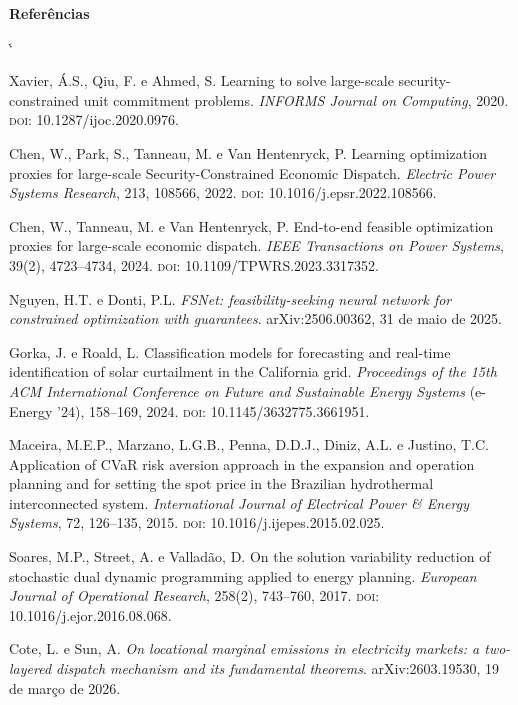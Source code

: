 \documentclass[10pt,a4paper,oneside]{book}
\makeatletter
\renewenvironment{thebibliography}[1]
  {\list{\@biblabel{\@arabic\c@enumiv}}%
     {\settowidth\labelwidth{\@biblabel{#1}}%
      \leftmargin\labelwidth \advance\leftmargin\labelsep
      \usecounter{enumiv}\let\p@enumiv\@empty
      \renewcommand\theenumiv{\@arabic\c@enumiv}}%
   \sloppy\clubpenalty4000 \@clubpenalty\clubpenalty
   \widowpenalty4000 \sfcode`\.\@m}
  {\endlist}
\makeatother
\begin{document}
\clearpage
{\sffamily\bfseries\large Referências\par}
\vspace{0.3em}
{\sffamily\fontsize{7.4}{9.4}\selectfont\color{tinta2}
\begin{thebibliography}{99}
\setlength{\itemsep}{0.2em}

 Xavier, Á.S., Qiu, F. e Ahmed, S. Learning to solve
  large-scale security-constrained unit commitment problems. \emph{INFORMS
  Journal on Computing}, 2020. \textsc{doi}: 10.1287/ijoc.2020.0976.

 Chen, W., Park, S., Tanneau, M. e Van Hentenryck, P.
  Learning optimization proxies for large-scale Security-Constrained Economic
  Dispatch. \emph{Electric Power Systems Research}, 213, 108566, 2022.
  \textsc{doi}: 10.1016/j.epsr.2022.108566.

 Chen, W., Tanneau, M. e Van Hentenryck, P. End-to-end
  feasible optimization proxies for large-scale economic dispatch. \emph{IEEE
  Transactions on Power Systems}, 39(2), 4723--4734, 2024. \textsc{doi}:
  10.1109/TPWRS.2023.3317352.

 Nguyen, H.T. e Donti, P.L. \emph{FSNet: feasibility-seeking
  neural network for constrained optimization with guarantees}.
  arXiv:2506.00362, 31 de maio de 2025.

 Gorka, J. e Roald, L. Classification models for forecasting
  and real-time identification of solar curtailment in the California grid.
  \emph{Proceedings of the 15th ACM International Conference on Future and
  Sustainable Energy Systems} (e-Energy '24), 158--169, 2024. \textsc{doi}:
  10.1145/3632775.3661951.

 Maceira, M.E.P., Marzano, L.G.B., Penna, D.D.J., Diniz,
  A.L. e Justino, T.C. Application of CVaR risk aversion approach in the
  expansion and operation planning and for setting the spot price in the
  Brazilian hydrothermal interconnected system. \emph{International Journal of
  Electrical Power \& Energy Systems}, 72, 126--135, 2015. \textsc{doi}:
  10.1016/j.ijepes.2015.02.025.

 Soares, M.P., Street, A. e Valladão, D. On the solution
  variability reduction of stochastic dual dynamic programming applied to
  energy planning. \emph{European Journal of Operational Research}, 258(2),
  743--760, 2017. \textsc{doi}: 10.1016/j.ejor.2016.08.068.

 Cote, L. e Sun, A. \emph{On locational marginal emissions in
  electricity markets: a two-layered dispatch mechanism and its fundamental
  theorems}. arXiv:2603.19530, 19 de março de 2026.


\end{thebibliography}}
\end{document}

